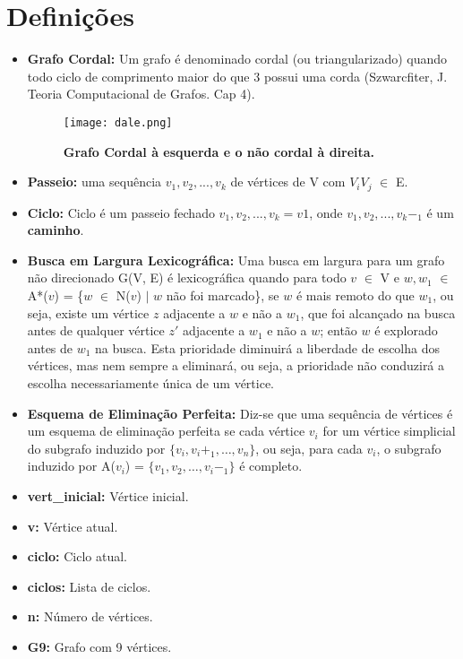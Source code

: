 \documentclass[a4paper, 11pt]{article}
\begin{document}
	\section{Definições}
		\begin{itemize}
			
			\item \textbf{Grafo Cordal:} Um grafo é denominado cordal (ou triangularizado) quando todo ciclo de comprimento maior do que 3 possui uma corda (Szwarcfiter, J. Teoria Computacional de Grafos. Cap 4). 
			
			\begin{figure}[H]
				\centering
					\texttt{[image: dale.png]}
				\caption{\textbf{Grafo Cordal à esquerda e o não cordal à direita.}}
			\end{figure}
			
			\item \textbf{Passeio:} uma sequência $v_1,v_2,...,v_k$ de vértices de V com $V_iV_j$ $\in$ E.
			
			\item \textbf{Ciclo:} Ciclo é um passeio fechado $v_1,v_2,...,v_k = v1$, onde $v_1,v_2,...,v_k-_1$ é um \textbf{caminho}.
			
			\item \textbf{Busca em Largura Lexicográfica:} Uma busca em largura para um grafo não direcionado G(V, E) é lexicográfica quando para todo $v$ $\in$ V e $w, w_1$ $\in$ A*($v$) = \{$w$ $\in$ N($v$) $\vert$ $w$ não foi marcado\}, se $w$ é mais remoto do que $w_1$, ou seja, existe um vértice $z$ adjacente a $w$ e não a $w_1$, que foi alcançado na busca antes de qualquer vértice $z'$ adjacente a $w_1$ e não a $w$; então $w$ é explorado antes de $w_1$ na busca. Esta prioridade diminuirá a liberdade de escolha dos vértices, mas nem sempre a eliminará, ou seja, a prioridade não conduzirá a escolha necessariamente única de um vértice.  
			
			\item \textbf{Esquema de Eliminação Perfeita:} Diz-se que uma sequência de vértices é um esquema de eliminação perfeita se cada vértice $v_i$ for um vértice simplicial do subgrafo induzido por $\{v_i, v_i+_1, …, v_n\} $, ou seja, para cada $v_i$, o subgrafo induzido por A($v_i$) = $\{v_1, v_2, …, v_i-_1\}$ é completo.
			
			\item \textbf{vert\_inicial:} Vértice inicial.
			\item \textbf{v:} Vértice atual.
			\item \textbf{ciclo:} Ciclo atual.
			\item \textbf{ciclos:} Lista de ciclos.
			\item \textbf{n:} Número de vértices.
			\item \textbf{G9:} Grafo com 9 vértices.
			
			
		\end{itemize}
\end{document}
